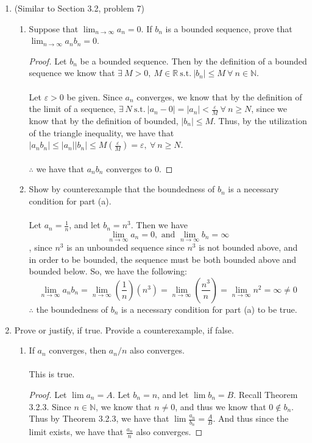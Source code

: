 \documentclass[12pt,letterpaper]{article}
\newcommand{\st}{\ \text{s.t.}\ }
\newcommand{\R}{\mathbb{R}}
\newcommand{\N}{\mathbb{N}}
\theoremstyle{case}
\begin{document}
\begin{enumerate}
	\item (Similar to Section 3.2, problem 7)
	\begin{enumerate}
		\item Suppose that $\lim_{n\to\infty} a_n=0$. If $b_n$ is a bounded sequence, prove that $\lim_{n\to\infty} a_nb_n=0$.
		\begin{proof}
			Let $b_n$ be a bounded sequence. Then by the definition of a bounded sequence we know that $\exists\ M>0,\ M \in \R \st |b_n| \leq M\ \forall\ n \in \N$.
			\\\\Let $\varepsilon >0$ be given. Since $a_n$ converges, we know that by the definition of the limit of a sequence, $\exists\ N \st |a_n-0|=|a_n|<\frac{\varepsilon}{M}\ \forall\ n \geq N$, since we know that by the definition of bounded, $|b_n| \leq M$. Thus, by the utilization of the triangle inequality, we have that $|a_nb_n| \leq |a_n||b_n|\leq M\left(\frac{\varepsilon}{M}\right)=\varepsilon,\ \forall\ n \geq N$.
			\\\\$\therefore$ we have that $a_nb_n$ converges to 0.
		\end{proof}
		
		\item Show by counterexample that the boundedness of $b_n$ is a necessary condition for part (a).
		\\\\Let $a_n=\frac{1}{n}$, and let $b_n=n^3$. Then we have
		\[\lim_{n\to\infty} a_n = 0, \text{ and } \lim_{n\to\infty} b_n = \infty\]
		, since $n^3$ is an unbounded sequence since $n^3$ is not bounded above, and in order to be bounded, the sequence must be both bounded above and bounded below. So, we have the following:
		\[\lim_{n\to\infty}a_nb_n = \lim_{n\to\infty} \left(\frac{1}{n}\right)(n^3) = \lim_{n\to\infty} \left(\frac{n^3}{n}\right) = \lim_{n\to\infty} n^2 = \infty \neq 0\]
		$\therefore$ the boundedness of $b_n$ is a necessary condition for part (a) to be true.
	\end{enumerate}

	\item Prove or justify, if true. Provide a counterexample, if false.
	\begin{enumerate}
		\item If $a_n$ converges, then $a_n/n$ also converges.
		\\\\This is true.
		\begin{proof}
			Let $\lim a_n = A$. Let $b_n = n$, and let $\lim b_n = B$. Recall Theorem 3.2.3. Since $n \in \N$, we know that $n \neq 0$, and thus we know that $0 \notin b_n$. Thus by Theorem 3.2.3, we have that $\lim \frac{a_n}{b_n} = \frac{A}{B}$. And thus since the limit exists, we have that $\frac{a_n}{n}$ also converges.
		\end{proof}
		

\end{enumerate}
\end{enumerate}
\end{document}
